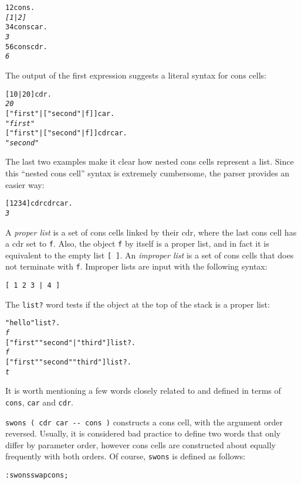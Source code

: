 \documentclass[english]{article}
\begin{document}
\begin{alltt}
1 2 cons .
\emph{{[} 1 | 2 {]}}
3 4 cons car .
\emph{3}
5 6 cons cdr .
\emph{6}
\end{alltt}
The output of the first expression suggests a literal syntax for cons
cells:

\begin{alltt}
{[} 10 | 20 {]} cdr .
\emph{20}
{[} "first" | {[} "second" | f {]} {]} car .
\emph{"first"}
{[} "first" | {[} "second" | f {]} {]} cdr car .
\emph{"second"}
\end{alltt}
The last two examples make it clear how nested cons cells represent
a list. Since this {}``nested cons cell'' syntax is extremely cumbersome,
the parser provides an easier way:

\begin{alltt}
{[} 1 2 3 4 {]} cdr cdr car .
\emph{3}
\end{alltt}
A \emph{proper list} is a set of cons cells linked by their cdr, where the last cons cell has a cdr set to \texttt{f}. Also, the object \texttt{f} by itself
is a proper list, and in fact it is equivalent to the empty list \texttt{{[}
{]}}. An \emph{improper list} is a set of cons cells that does not terminate with \texttt{f}. Improper lists are input with the following syntax:

\begin{verbatim}
[ 1 2 3 | 4 ]
\end{verbatim}

The \texttt{list?} word tests if the object at the top of the stack
is a proper list:

\begin{alltt}
"hello" list? .
\emph{f}
{[} "first" "second" | "third" {]} list? .
\emph{f}
{[} "first" "second" "third" {]} list? .
\emph{t}
\end{alltt}

It is worth mentioning a few words closely related to and defined in terms of \texttt{cons}, \texttt{car} and \texttt{cdr}.

\texttt{swons ( cdr car -{}- cons )} constructs a cons cell, with the argument order reversed. Usually, it is considered bad practice to define two words that only differ by parameter order, however cons cells are constructed about equally frequently with both orders. Of course, \texttt{swons} is defined as follows:

\begin{alltt}
: swons swap cons ;
\end{alltt}
\end{document}
